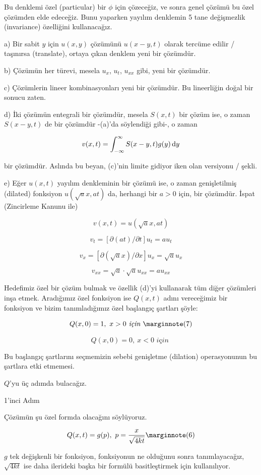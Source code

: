 \documentclass[12pt,fleqn]{article}\usepackage{../../common}
\begin{document}
Bu denklemi özel (particular) bir $\phi$ için çözeceğiz, ve sonra genel
çözümü bu özel çözümden elde edeceğiz. Bunu yaparken yayılım denklemin 5
tane değişmezlik (invariance) özelliğini kullanacağız.

a) Bir sabit $y$ için $u(x,y)$ çözümünü $u(x-y,t)$ olarak tercüme edilir /
taşınırsa (translate), ortaya çıkan denklem yeni bir çözümdür.

b) Çözümün her türevi, mesela $u_x$, $u_t$, $u_{xx}$ gibi, yeni bir
çözümdür. 

c) Çözümlerin lineer kombinasyonları yeni bir çözümdür. Bu lineerliğin
doğal bir sonucu zaten.

d) İki çözümün entegrali bir çözümdür, mesela $S(x,t)$ bir çözüm ise, o
zaman $S(x-y,t)$ de bir çözümdür -(a)'da söylendiği gibi-, o zaman

$$ v(x,t) = \int_{-\infty}^{\infty}S(x-y,t)g(y)\,\mathrm{d} y   $$

bir çözümdür. Aslında bu beyan, (c)'nin limite gidiyor iken olan versiyonu
/ şekli.

e) Eğer $u(x,t)$ yayılım denkleminin bir çözümü ise, o zaman genişletilmiş
(dilated) fonksiyon $u(\sqrt{a} x, at)$ da, herhangi bir $a>0$ için, bir
çözümdür. İspat (Zincirleme Kanunu ile)

$$ v(x,t) =  u(\sqrt{a} x, at) $$

$$ v_t = [\partial(at) / \partial t]u_t = au_t $$

$$ v_x = [\partial(\sqrt{a}x) / \partial x]u_x = \sqrt{a}u_x $$

$$ v_{xx} = \sqrt{a} \cdot \sqrt{a} u_{xx} = a u_{xx} $$

Hedefimiz özel bir çözüm bulmak ve özellik (d)'yi kullanarak tüm diğer
çözümleri inşa etmek. Aradığımız özel fonksiyon ise $Q(x,t)$ adını
vereceğimiz  bir fonksiyon ve bizim tanımladığımız özel başlangıç
şartları şöyle:

$$
Q(x,0) = 1, \ x>0 \textit{ için } \mlabel{7}
$$

$$ Q(x,0)=0, \ x<0 \textit{ için }  $$

Bu başlangıç şartlarını seçmemizin sebebi genişletme (dilation)
operasyonunun bu şartlara etki etmemesi. 

$Q$'yu üç adımda bulacağız. 

1'inci Adım

Çözümün şu özel formda olacağını söylüyoruz. 

$$ Q(x,t) = g(p), \ p = \frac{x}{\sqrt{4kt}} 
\mlabel{6} $$


$g$ tek değişkenli bir fonksiyon, fonksiyonun ne olduğunu sonra
tanımlayacağız, $\sqrt{4kt}$ ise daha ilerideki başka bir formülü
basitleştirmek için kullanılıyor. 
\end{document}
